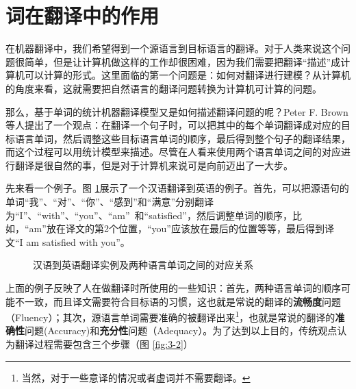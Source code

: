 
\section{词在翻译中的作用}

\parinterval 在机器翻译中，我们希望得到一个源语言到目标语言的翻译。对于人类来说这个问题很简单，但是让计算机做这样的工作却很困难，因为我们需要把翻译``描述''成计算机可以计算的形式。这里面临的第一个问题是：如何对翻译进行建模？从计算机的角度来看，这就需要把自然语言的翻译问题转换为计算机可计算的问题。

\parinterval 那么，基于单词的统计机器翻译模型又是如何描述翻译问题的呢？Peter F. Brown等人提出了一个观点\cite{Peter1993The}：在翻译一个句子时，可以把其中的每个单词翻译成对应的目标语言单词，然后调整这些目标语言单词的顺序，最后得到整个句子的翻译结果，而这个过程可以用统计模型来描述。尽管在人看来使用两个语言单词之间的对应进行翻译是很自然的事，但是对于计算机来说可是向前迈出了一大步。

\parinterval 先来看一个例子。图 \ref{fig:3-1}展示了一个汉语翻译到英语的例子。首先，可以把源语句的单词``我''、``对''、``你''、``感到''和``满意''分别翻译为``I''、``with''、``you''、``am''\ 和``satisfied''，然后调整单词的顺序，比如，``am''放在译文的第2个位置，``you''应该放在最后的位置等等，最后得到译文``I am satisfied with you''。

\begin{figure}[htp]
    \centering

    \caption{汉语到英语翻译实例及两种语言单词之间的对应关系}
    \label{fig:3-1}
\end{figure}

\parinterval 上面的例子反映了人在做翻译时所使用的一些知识：首先，两种语言单词的顺序可能不一致，而且译文需要符合目标语的习惯，这也就是常说的翻译的{\small\sffamily\bfseries{流畅度}}问题（Fluency）；其次，源语言单词需要准确的被翻译出来\footnote{当然，对于一些意译的情况或者虚词并不需要翻译。}，也就是常说的翻译的{\small\sffamily\bfseries{准确性}}问题(Accuracy)和{\small\sffamily\bfseries{充分性}}问题（Adequacy）。为了达到以上目的，传统观点认为翻译过程需要包含三个步骤（图 \ref{fig:3-2}）

